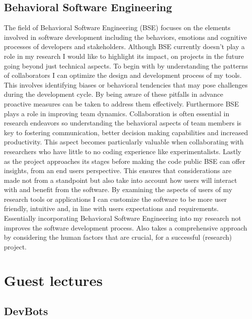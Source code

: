 \documentclass[11pt,a4paper]{article}
\begin{document}
\subsection{Behavioral Software Engineering}
The field of Behavioral Software Engineering (BSE) focuses on the elements involved in software development including the behaviors, emotions and cognitive processes of developers and stakeholders. Although BSE currently doesn't play a role in my research I would like to highlight its impact, on projects in the future going beyond just technical aspects.
To begin with by understanding the patterns of collaborators I can optimize the design and development process of my tools. This involves identifying biases or behavioral tendencies that may pose challenges during the development cycle. By being aware of these pitfalls in advance proactive measures can be taken to address them effectively.
Furthermore BSE plays a role in improving team dynamics. Collaboration is often essential in research endeavors so understanding the behavioral aspects of team members is key to fostering communication, better decision making capabilities and increased productivity. This aspect becomes particularly valuable when collaborating with researchers who have little to no coding experience like experimentalists.
Lastly as the project approaches its stages before making the code public BSE can offer insights, from an end users perspective. This ensures that considerations are made not from a standpoint but also take into account how users will interact with and benefit from the software.
By examining the aspects of users of my research tools or applications I can customize the software to be more user friendly, intuitive and, in line with users expectations and requirements. Essentially incorporating Behavioral Software Engineering into my research not improves the software development process. Also takes a comprehensive approach by considering the human factors that are crucial, for a successful (research) project.




\section{Guest lectures}

\subsection{DevBots}
\end{document}
